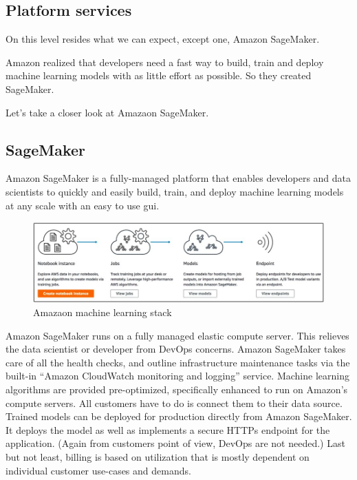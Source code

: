 \documentclass[thesis=M,english]{FITthesis}[2012/06/26]
\begin{document}
\subsection{Platform services}

On this level resides what we can expect, except one, Amazon SageMaker.

Amazon realized that developers need a fast way to build, train and deploy machine learning models with as little effort as possible. So they created SageMaker.

Let's take a closer look at Amazaon SageMaker.

\subsection{SageMaker} 

Amazon SageMaker is a fully-managed platform that enables developers and data scientists to quickly and easily build, train, and deploy machine learning models at any scale with an easy to use \acrshort{gui}.\\

\begin{figure}[h!]\centering
	\includegraphics[width=1\textwidth]{pictures/ml_aws_sagemaker_buildprocess}
	\caption{Amazaon machine learning stack \cite{ml_aws}}\label{fig:ml_aws_sagemaker_buildprocess}
\end{figure}

Amazon SageMaker runs on a fully managed elastic compute server. This relieves the data scientist or developer from DevOps concerns. Amazon SageMaker takes care of all the health checks, and outline infrastructure maintenance tasks via the built-in “Amazon CloudWatch monitoring and logging” service. Machine learning algorithms are provided pre-optimized, specifically enhanced to run on Amazon’s compute servers. All customers have to do is connect them to their data source. 
Trained models can be deployed for production directly from Amazon SageMaker. It deploys the model as well as implements a secure HTTPs endpoint for the application. (Again from customers point of view, DevOps are not needed.) 
Last but not least, billing is based on utilization that is mostly dependent on individual customer use-cases and demands.
\end{document}
